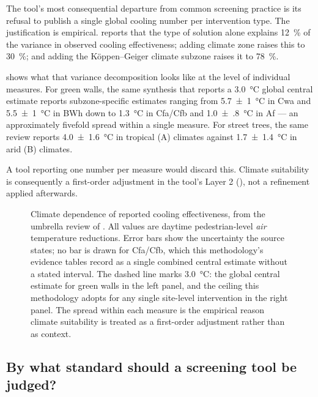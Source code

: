 The tool's most consequential departure from common screening practice is its
refusal to publish a single global cooling number per intervention type. The
justification is empirical. \textcite{keravec2026} reports that the type of
solution alone explains \SI{12}{\percent} of the variance in observed cooling
effectiveness; adding climate zone raises this to \SI{30}{\percent}; and adding
the K\"oppen--Geiger climate subzone raises it to \SI{78}{\percent}.

 shows what that variance decomposition looks like
at the level of individual measures. For green walls, the same synthesis that
reports a \qty{3.0}{\degreeCelsius} global central estimate reports
subzone-specific estimates ranging from \qty{5.7(10)}{\degreeCelsius} in Cwa
and \qty{5.5(10)}{\degreeCelsius} in BWh down to \qty{1.3}{\degreeCelsius} in
Cfa/Cfb and \qty{1.0(8)}{\degreeCelsius} in Af --- an approximately fivefold
spread within a single measure. For street trees, the same review reports
\qty{4.0(16)}{\degreeCelsius} in tropical (A) climates against
\qty{1.7(14)}{\degreeCelsius} in arid (B) climates.

A tool reporting one number per measure would discard this. Climate suitability
is consequently a first-order adjustment in the tool's Layer 2
(), not a refinement applied afterwards.

\begin{figure}[htbp]
\centering

\caption[Climate dependence of cooling effectiveness]{Climate dependence of
reported cooling effectiveness, from the umbrella review of
\textcite{keravec2026}. All values are daytime pedestrian-level
\emph{air} temperature reductions. Error bars show the uncertainty the source
states; no bar is drawn for Cfa/Cfb, which this methodology's evidence tables
record as a single combined central estimate without a stated interval. The dashed line marks \qty{3.0}{\degreeCelsius}: the
global central estimate for green walls in the left panel, and the ceiling this
methodology adopts for any single site-level intervention in the right panel.
The spread within each measure is the empirical reason climate suitability is
treated as a first-order adjustment rather than as context.}
\label{fig:climate-dependence}
\end{figure}

\subsection{By what standard should a screening tool be judged?}
\label{sec:standards}


